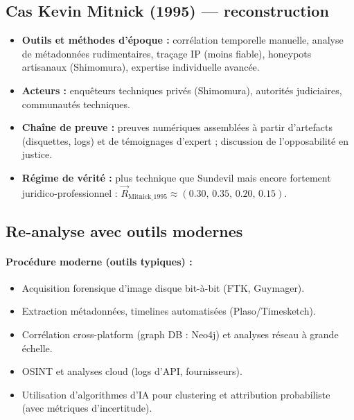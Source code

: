 \documentclass[memoire, 12pt]{report}
\begin{document}
\subsection*{Cas Kevin Mitnick (1995) — reconstruction}
\begin{itemize}
  \item \textbf{Outils et méthodes d'époque :} corrélation temporelle manuelle, analyse de métadonnées rudimentaires, traçage IP (moins fiable), honeypots artisanaux (Shimomura), expertise individuelle avancée.
  \item \textbf{Acteurs :} enquêteurs techniques privés (Shimomura), autorités judiciaires, communautés techniques.
  \item \textbf{Chaîne de preuve :} preuves numériques assemblées à partir d'artefacts (disquettes, logs) et de témoignages d'expert ; discussion de l'opposabilité en justice.
  \item \textbf{Régime de vérité :} plus technique que Sundevil mais encore fortement juridico-professionnel : $\vec{R}_{\text{Mitnick\_1995}} \approx (0.30,\,0.35,\,0.20,\,0.15)$.
\end{itemize}

\subsection*{Re-analyse avec outils modernes}
\paragraph{Procédure moderne (outils typiques) :}
\begin{itemize}
  \item Acquisition forensique d'image disque bit-à-bit (FTK, Guymager).
  \item Extraction métadonnées, timelines automatisées (Plaso/Timesketch).
  \item Corrélation cross-platform (graph DB : Neo4j) et analyses réseau à grande échelle.
  \item OSINT et analyses cloud (logs d'API, fournisseurs).
  \item Utilisation d'algorithmes d'IA pour clustering et attribution probabiliste (avec métriques d'incertitude).
\end{itemize}
\end{document}
